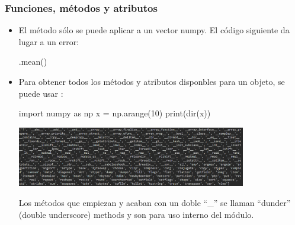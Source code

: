 \documentclass[handout,9pt]{beamer}
\begin{document}
\begin{frame}[fragile]
  \frametitle{Funciones, métodos y atributos}
  \begin{itemize}
  \item El método   sólo se puede aplicar a un vector numpy.
    El código siguiente da lugar a un error:
    \begin{pyverbatim}
[0, 1, 2, 3, 4, 5, 6, 7, 8, 9].mean()      
    \end{pyverbatim}
  \item<2-> Para obtener todos los métodos y atributos disponbles para
    un objeto, se puede usar :
    \begin{pyverbatim}
import numpy as np
x = np.arange(10)
print(dir(x))
\end{pyverbatim}
  \begin{center}
    \includegraphics[width=10cm]{dir_ndarray}
  \end{center}
  Los métodos que empiezan y acaban con un doble  ``\_'' se llaman
  ``dunder'' (double underscore)  methods y son para uso interno del módulo.
  \end{itemize}
\end{frame}
  
\end{document}
